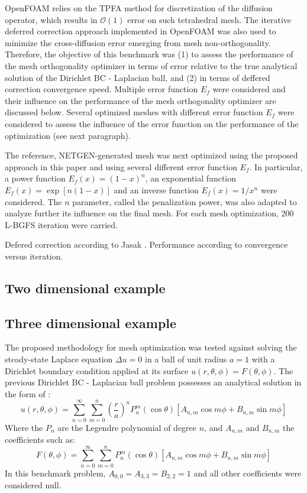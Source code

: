 \documentclass[11pt]{article}
\begin{document}
OpenFOAM relies on the TPFA method for discretization of the diffusion operator, which results in $\mathcal{O}(1)$ error on such tetrahedral mesh.
The iterative deferred correction approach implemented in OpenFOAM was also used to minimize the cross-diffusion error emerging from mesh non-orthogonality.
Therefore, the objective of this benchmark was (1) to assess the performance of the mesh orthogonality optimizer in terms of error relative to the true analytical solution of the Dirichlet BC - Laplacian ball, and (2) in terms of deffered correction convergence speed.
Multiple error function $E_f$ were considered and their influence on the performance of the mesh orthogonality optimizer are discussed below.
Several optimized meshes with different error function $E_f$ were considered to assess the influence of the error function on the performance of the optimization (see next paragraph).

The reference, NETGEN-generated mesh was next optimized using the proposed approach in this paper and using several different error function $E_f$.
In particular, a power function $E_f(x) = (1-x)^n$, an exponential function $E_f(x) = \exp \left[n(1-x) \right]$ and an inverse function $E_f(x) = 1/x^n$ were considered.
The $n$ parameter, called the penalization power, was also adapted to analyze further its influence on the final mesh.
For each mesh optimization, 200 L-BGFS iteration were carried.

Defered correction according to Jasak \cite{}. Performance according to convergence versus iteration.



\subsection{Two dimensional example}

\subsection{Three dimensional example}

The proposed methodology for mesh optimization was tested against solving the steady-state Laplace equation $\Delta u = 0$ in a ball of unit radius $a=1$ with a Dirichlet boundary condition applied at its surface $u(r,\theta,\phi) = F(\theta,\phi)$. %
The previous Dirichlet BC - Laplacian ball problem possesses an analytical solution in the form of \cite{carslaw_jeager_1957}:
%
\begin{equation}
u(r, \theta, \phi) = \sum_{n=0}^\infty \sum_{m=0}^n \left(\frac{r}{a}\right)^n P_n^m(\cos \theta) \left[ A_{n,m} \cos m\phi + B_{n,m} \sin m\phi \right]
\end{equation} 
%
Where the $P_n$ are the Legendre polynomial of degree $n$, and $A_{n,m}$ and $B_{n,m}$ the coefficients such as:
%
\begin{equation}
F(\theta, \phi) = \sum_{n=0}^\infty \sum_{m=0}^n P_n^m(\cos \theta) \left[ A_{n,m} \cos m\phi + B_{n,m} \sin m\phi \right]
\end{equation}
%
In this benchmark problem, $A_{0,0} = A_{3,3} = B_{2,2} =1$ and all other coefficients were considered null.
\end{document}
